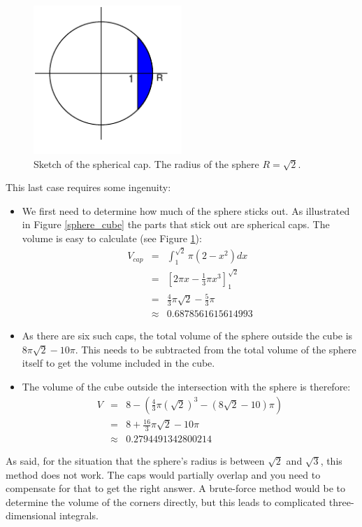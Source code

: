 \documentclass[onecolumn]{article}
\begin{document}
\begin{figure}[H]
\caption{Sketch of the spherical cap. The radius of the sphere $R = \sqrt{2}$.}
\label{integral}
\begin{center}
\includegraphics[width=0.5\textwidth]{integral_chord.pdf}
\end{center}
\end{figure}

This last case requires some ingenuity:
\begin{itemize}
\item
We first need to determine how much of the sphere sticks out. As illustrated in Figure \ref{sphere_cube} the
parts that stick out are spherical caps. The volume is easy to calculate (see Figure \ref{integral}):
\begin{eqnarray}
\nonumber V_{cap} &=& \int_{1}^{\sqrt{2}} \pi (2 - x^2) dx \\
\nonumber         &=& \left [2 \pi x - \frac{1}{3} \pi x^3 \right ]_{1}^{\sqrt{2}} \\
\nonumber         &=& \frac{4}{3} \pi \sqrt{2} - \frac{5}{3} \pi \\
\nonumber         &\approx& 0.6878561615614993
\end{eqnarray}

\item
As there are six such caps, the total volume of the sphere outside the cube is $8 \pi \sqrt{2} - 10 \pi$. This
needs to be subtracted from the total volume of the sphere itself to get the volume included in the cube.

\item
The volume of the cube outside the intersection with the sphere is therefore:
\begin{eqnarray}
\nonumber V &=& 8 - \left ( \frac{4}{3} \pi (\sqrt{2})^3 - (8 \sqrt{2} - 10) \pi \right ) \\
\nonumber   &=& 8 + \frac{16}{3} \pi \sqrt{2} - 10 \pi \\
\nonumber   &\approx& 0.2794491342800214
\end{eqnarray}

\end{itemize}

As said, for the situation that the sphere's radius is between $\sqrt{2}$ and $\sqrt{3}$, this method
does not work. The caps would partially overlap and you need to compensate for that to get the right
answer. A brute-force method would be to determine the volume of the corners directly, but this leads
to complicated three-dimensional integrals.
\end{document}
